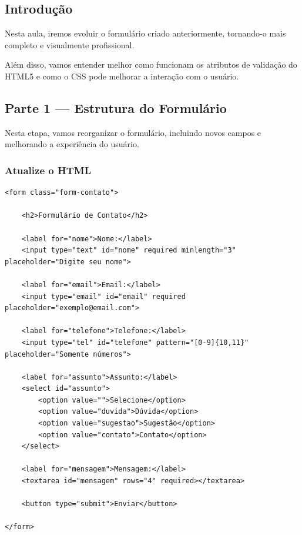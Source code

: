 \documentclass[12pt,a4paper]{article}
\begin{document}

\subsection{Introdução}

Nesta aula, iremos evoluir o formulário criado anteriormente, tornando-o mais completo e visualmente profissional.

Além disso, vamos entender melhor como funcionam os atributos de validação do HTML5 e como o CSS pode melhorar a interação com o usuário.


\subsection{Parte 1 — Estrutura do Formulário}

Nesta etapa, vamos reorganizar o formulário, incluindo novos campos e melhorando a experiência do usuário.

\subsubsection{Atualize o HTML}

\begin{boxCodigo}
\begin{verbatim}
<form class="form-contato">

    <h2>Formulário de Contato</h2>

    <label for="nome">Nome:</label>
    <input type="text" id="nome" required minlength="3" placeholder="Digite seu nome">

    <label for="email">Email:</label>
    <input type="email" id="email" required placeholder="exemplo@email.com">

    <label for="telefone">Telefone:</label>
    <input type="tel" id="telefone" pattern="[0-9]{10,11}" placeholder="Somente números">

    <label for="assunto">Assunto:</label>
    <select id="assunto">
        <option value="">Selecione</option>
        <option value="duvida">Dúvida</option>
        <option value="sugestao">Sugestão</option>
        <option value="contato">Contato</option>
    </select>

    <label for="mensagem">Mensagem:</label>
    <textarea id="mensagem" rows="4" required></textarea>

    <button type="submit">Enviar</button>

</form>
\end{verbatim}
\end{boxCodigo}
\end{document}
